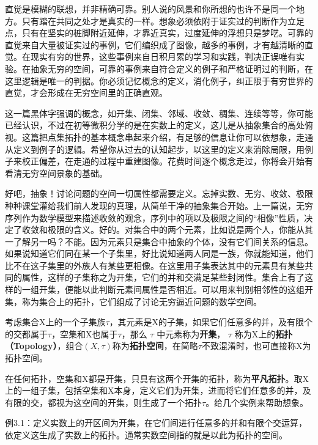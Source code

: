 直觉是模糊的联想，并非精确可靠。别人说的风景和你所想的也许不是同一个地方。只有踏在共同之处才是真实的一样。想象必须依附于证实过的判断作为立足点，只有在坚实的桩脚附近延伸，才靠近真实，过度延伸的浮想只是梦呓。可靠的直觉来自大量被证实过的事例，它们编织成了图像，越多的事例，才有越清晰的直觉。在现实有穷的世界，这些事例来自日积月累的学习和实践，判决正误唯有实验。在抽象无穷的空间，可靠的事例来自符合定义的例子和严格证明过的判断，在这里逻辑是唯一的判据。你必须记忆概念的定义，消化例子，纠正限于有穷世界的直觉，才会形成在无穷空间里的正确直观。

这一篇黑体字强调的概念，如开集、闭集、邻域、收敛、稠集、连续等等，你可能已经认识，不过在初等微积分学的是在实数上的定义，这儿是从抽象集合的高处俯视。这篇把点集拓扑的基本概念串起来介绍，有足够的信息让你可以依想象，走通从定义到例子的逻辑。希望你从过去的认知起步，以这里的定义来消除局限，用例子来校正偏差，在走通的过程中重建图像。花费时间逐个概念走过，你将会开始有看清无穷空间景象的基础。

好吧，抽象！讨论问题的空间一切属性都需要定义。忘掉实数、无穷、收敛、极限种种课堂灌给我们前人发现的真理，从简单干净的抽象集合开始。上一篇说，无穷序列作为数学模型来描述收敛的观念，序列中的项以及极限之间的“相像”性质，决定了收敛和极限的含义。好的。对集合中的两个元素，比如说是两个人，你能从其一了解另一吗？不能。因为元素只是集合中抽象的个体，没有它们间关系的信息。如果说知道它们同在某一个子集里，好比说知道两人同是一族，你就能知道，他们比不在这子集里的外族人有某些更相像。在这里用子集表达其中的元素具有某些共同的属性，这样的子集称之为开集，它们的并和交满足某些封闭性。集合上有了这样的一组开集，便能以此判断元素间属性是否相近。可以用来判别相邻性的这组开集，称为集合上的拓扑，它们组成了讨论无穷逼近问题的数学空间。

\kaishu
\setlength{\leftskip}{1em}
考虑集合X上的一个子集族$ \tau $，其元素是X的子集，如果它们任意多的并，及有限个的交都属于$ \tau $，空集和X也属于$ \tau $，那么 $ \tau $ 中元素称为\textbf{开集}， $ \tau $ 称为X上的\textbf{拓扑（Topology）}，组合$ (X, \tau)$称为\textbf{拓扑空间}，在简略$\tau$不致混淆时，也可直接称X为拓扑空间。

\songti
\setlength{\leftskip}{0em}

在任何拓扑，空集和X都是开集，只具有这两个开集的拓扑，称为\textbf{平凡拓扑}。取X上的一组子集，包括空集和X本身，定义它们为开集，进而将它们任意多的并，及有限的交，都视为这空间的开集，则生成了一个拓扑$\tau$。给几个实例来帮助想象。

\kaishu
\setlength{\leftskip}{1em}

\noindent
例3.1：定义实数上的开区间为开集，在它们间进行任意多的并和有限个交运算，依定义这生成了实数上的拓扑。通常实数空间指的就是以此为拓扑的空间。

